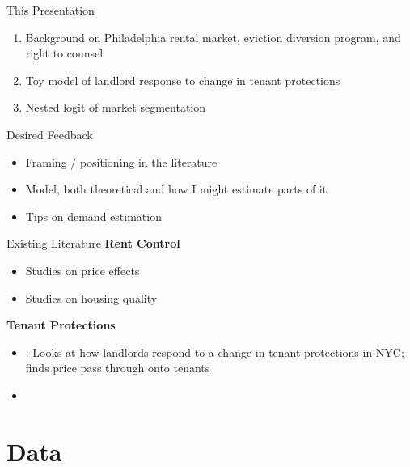 \documentclass[10pt, xcolor=dvipsnames]{beamer}
\begin{document}
\begin{frame}{This Presentation}
    \begin{enumerate}
        \item Background on Philadelphia rental market, eviction diversion program, and right to counsel
        \item Toy model of landlord response to change in tenant protections
        \item Nested logit of market segmentation
    \end{enumerate}
    
\end{frame}

\begin{frame}{Desired Feedback}
    \begin{itemize}
        \item Framing / positioning in the literature
        \item Model, both theoretical and how I might estimate parts of it
        \item Tips on demand estimation
    \end{itemize}
    
\end{frame}

\begin{frame}{Existing Literature}
    \textbf{Rent Control}
    \begin{itemize}
        \item Studies on price effects \cite{diamond-2019, Jofre_Monseny_2023, Kholodilin_2024}
        \item Studies on housing quality \cite{Gyourko_1990 }
    \end{itemize}
    \textbf{Tenant Protections}
    \begin{itemize}
        \item \cite{humphries-2024}: Looks at how landlords respond to a change in tenant protections in NYC; finds price pass through onto tenants
        \item \cite{abramson_2021, Asquith_2019, Corbae_2024} 
    \end{itemize}
    
\end{frame}


\section{Data}
\end{document}
